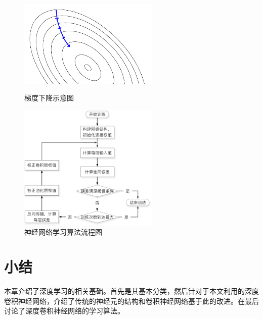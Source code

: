 \begin{figure}[hbt]
	\centering
	\begin{minipage}[b][][b]{7cm}
		\includegraphics[width=6.67cm]{figures/networks/gradient-descent}
    \caption{梯度下降示意图}
    \label{fig:gradient-descent}
	\end{minipage}
	\hspace{10pt}
	\begin{minipage}[b][][b]{7cm}
		\includegraphics[width=6.67cm]{figures/networks/cnn_train}
    \caption{神经网络学习算法流程图}
    \label{fig:cnn_train}

	\end{minipage}

\end{figure}

\section{小结}
本章介绍了深度学习的相关基础。首先是其基本分类，然后针对于本文利用的深度卷积神经网络，介绍了传统的神经元的结构和卷积神经网络基于此的改进。在最后讨论了深度卷积神经网络的学习算法。
